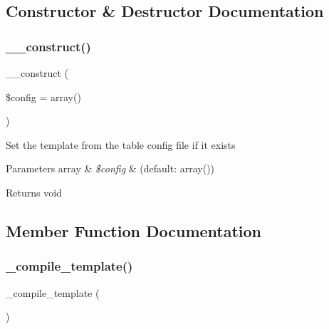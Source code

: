 \subsection{Constructor \& Destructor Documentation}
\mbox{\label{class_c_i___table_af7f9493844d2d66e924e3c1df51ce616}} 
\subsubsection{\texorpdfstring{\+\_\+\+\_\+construct()}{\_\_construct()}}
{\footnotesize\ttfamily \+\_\+\+\_\+construct (\begin{DoxyParamCaption}\item[{}]{\$config = {\ttfamily array()} }\end{DoxyParamCaption})}

Set the template from the table config file if it exists


\begin{DoxyParams}[1]{Parameters}
array & {\em \$config} & (default\+: array()) \\
\hline
\end{DoxyParams}
\begin{DoxyReturn}{Returns}
void 
\end{DoxyReturn}


\subsection{Member Function Documentation}
\mbox{\label{class_c_i___table_a7f408fd4eecadb5799d5ae004170c4d6}} 
\subsubsection{\texorpdfstring{\+\_\+compile\+\_\+template()}{\_compile\_template()}}
{\footnotesize\ttfamily \+\_\+compile\+\_\+template (\begin{DoxyParamCaption}{ }\end{DoxyParamCaption})\hspace{0.3cm}{\ttfamily [protected]}}


